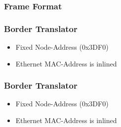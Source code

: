 \documentclass[aspectratio=169]{beamer}
\begin{document}
\begin{frame}
	\frametitle{Frame Format}
	
\end{frame}

\begin{frame}
	\frametitle{Border Translator}
	\begin{itemize}
		\item Fixed Node-Address (0x3DF0)
		\item Ethernet MAC-Address is inlined
	\end{itemize}
	
\end{frame}

\begin{frame}
	\frametitle{Border Translator}
	\begin{itemize}
		\item Fixed Node-Address (0x3DF0)
		\item Ethernet MAC-Address is inlined
	\end{itemize}
	
\end{frame}
\end{document}
